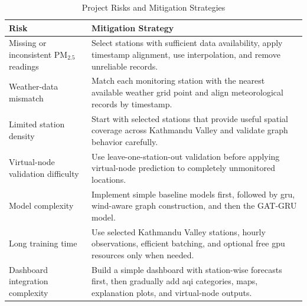 \begin{table}[H]
    \centering
    \small
    \caption{Project Risks and Mitigation Strategies}
    \label{tab:risk_mitigation}
    \renewcommand{\arraystretch}{1.2}
    \setlength{\tabcolsep}{4pt}

    \begin{tabularx}{0.94\linewidth}{|
        >{\raggedright\arraybackslash}p{3.4cm}|
        >{\raggedright\arraybackslash}X|}
        \hline
        \textbf{Risk} & \textbf{Mitigation Strategy} \\
        \hline

        Missing or inconsistent PM$_{2.5}$ readings &
        Select stations with sufficient data availability, apply timestamp alignment, use interpolation, and remove unreliable records. \\
        \hline

        Weather-data mismatch &
        Match each monitoring station with the nearest available weather grid point and align meteorological records by timestamp. \\
        \hline

        Limited station density &
        Start with selected stations that provide useful spatial coverage across Kathmandu Valley and validate graph behavior carefully. \\
        \hline

        Virtual-node validation difficulty &
        Use leave-one-station-out validation before applying virtual-node prediction to completely unmonitored locations. \\
        \hline

        Model complexity &
        Implement simple baseline models first, followed by \gls{gru}, wind-aware graph construction, and then the GAT-GRU model. \\
        \hline

        Long training time &
        Use selected Kathmandu Valley stations, hourly observations, efficient batching, and optional free \gls{gpu} resources only when needed. \\
        \hline

        Dashboard integration complexity &
        Build a simple dashboard with station-wise forecasts first, then gradually add \gls{aqi} categories, maps, explanation plots, and virtual-node outputs. \\
        \hline
    \end{tabularx}
\end{table}

